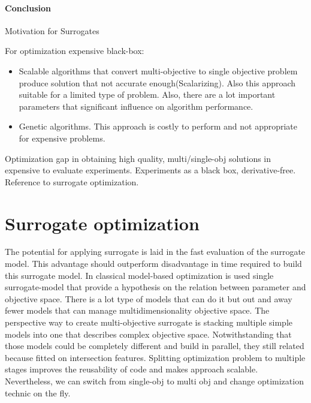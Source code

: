         \paragraph{Conclusion}
            Motivation for Surrogates

            For optimization expensive black-box:
            \begin{itemize}
                \item Scalable algorithms that convert multi-objective to single objective problem produce solution that not accurate enough(Scalarizing). Also this approach suitable for a limited type of problem. Also, there are a lot important parameters that significant influence on algorithm performance.
                \item Genetic algorithms. This approach is costly to perform and not appropriate for expensive problems.
            \end{itemize}
            Optimization gap in obtaining high quality, multi/single-obj solutions in expensive to evaluate experiments.
            Experiments as a black box, derivative-free. Reference to surrogate optimization.


    \section{Surrogate optimization} 

        The potential for applying surrogate is laid in the fast evaluation of the surrogate model. This advantage should outperform disadvantage in time required to build this surrogate model. In classical model-based optimization is used single surrogate-model that provide a hypothesis on the relation between parameter and objective space. There is a lot type of models that can do it but out and away fewer models that can manage multidimensionality objective space. The perspective way to create multi-objective surrogate is stacking multiple simple models into one that describes complex objective space. Notwithstanding that those models could be completely different and build in parallel, they still related because fitted on intersection features.
        Splitting optimization problem to multiple stages improves the reusability of code and makes approach scalable. Nevertheless, we can switch from single-obj to multi obj and change optimization technic on the fly.


